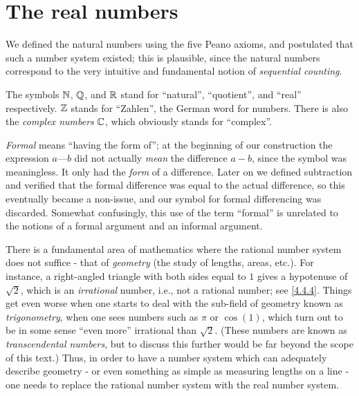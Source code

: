 \chapter{The real numbers}\label{ch:5}

\begin{note}
  We defined the natural numbers using the five Peano axioms, and postulated that such a number system existed;
  this is plausible, since the natural numbers correspond to the very intuitive and fundamental notion of \emph{sequential counting}.
\end{note}

\begin{note}
  The symbols \(\mathbb{N}\), \(\mathbb{Q}\), and \(\mathbb{R}\) stand for ``natural'', ``quotient'', and ``real'' respectively.
  \(\mathbb{Z}\) stands for ``Zahlen'', the German word for numbers.
  There is also the \emph{complex numbers} \(\mathbb{C}\), which obviously stands for ``complex''.
\end{note}

\begin{note}
  \emph{Formal} means ``having the form of'';
  at the beginning of our construction the expression \(a \text{---} b\) did not actually \emph{mean} the difference \(a - b\), since the symbol \text{---} was meaningless.
  It only had the \emph{form} of a difference.
  Later on we defined subtraction and verified that the formal difference was equal to the actual difference, so this eventually became a non-issue, and our symbol for formal differencing was discarded.
  Somewhat confusingly, this use of the term ``formal'' is unrelated to the notions of a formal argument and an informal argument.
\end{note}

\begin{note}
  There is a fundamental area of mathematics where the rational number system does not suffice - that of \emph{geometry}
  (the study of lengths, areas, etc.).
  For instance, a right-angled triangle with both sides equal to \(1\) gives a hypotenuse of \(\sqrt{2}\), which is an \emph{irrational} number, i.e., not a rational number;
  see \cref{4.4.4}.
  Things get even worse when one starts to deal with the sub-field of geometry known as \emph{trigonometry}, when one sees numbers such as \(\pi\) or \(\cos(1)\), which turn out to be in some sense ``even more'' irrational than \(\sqrt{2}\).
  (These numbers are known as \emph{transcendental numbers}, but to discuss this further would be far beyond the scope of this text.)
  Thus, in order to have a number system which can adequately describe geometry
  - or even something as simple as measuring lengths on a line
  - one needs to replace the rational number system with the real number system.
\end{note}

